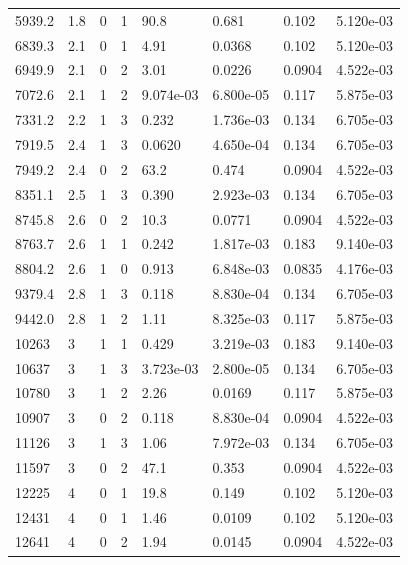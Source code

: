 \documentclass[preview]{standalone}
\begin{document}
{{\begin{tabular}{L{1.2cm}C{1.2cm} C{0.3cm}C{0.5cm} C{1.4cm}C{1.4cm} C{1.4cm}C{1.4cm}}
  5939.2  &   1.8  & 0     &  1 &  90.8  & 0.681  & 0.102 &  5.120e-03   \\ 
  6839.3  &   2.1  & 0     &  1 &  4.91  & 0.0368  & 0.102 &  5.120e-03   \\ 
  6949.9  &   2.1  & 0     &  2 &  3.01  & 0.0226  & 0.0904 &  4.522e-03   \\ 
  7072.6  &   2.1  & 1     &  2 &  9.074e-03  & 6.800e-05  & 0.117 &  5.875e-03   \\ 
  7331.2  &   2.2  & 1     &  3 &  0.232  & 1.736e-03  & 0.134 &  6.705e-03   \\ 
  7919.5  &   2.4  & 1     &  3 &  0.0620  & 4.650e-04  & 0.134 &  6.705e-03   \\ 
  7949.2  &   2.4  & 0     &  2 &  63.2  & 0.474  & 0.0904 &  4.522e-03   \\ 
  8351.1  &   2.5  & 1     &  3 &  0.390  & 2.923e-03  & 0.134 &  6.705e-03   \\ 
  8745.8  &   2.6  & 0     &  2 &  10.3  & 0.0771  & 0.0904 &  4.522e-03   \\ 
  8763.7  &   2.6  & 1     &  1 &  0.242  & 1.817e-03  & 0.183 &  9.140e-03   \\ 
  8804.2  &   2.6  & 1     &  0 &  0.913  & 6.848e-03  & 0.0835 &  4.176e-03   \\ 
  9379.4  &   2.8  & 1     &  3 &  0.118  & 8.830e-04  & 0.134 &  6.705e-03   \\ 
  9442.0  &   2.8  & 1     &  2 &  1.11  & 8.325e-03  & 0.117 &  5.875e-03   \\ 
  10263  &     3  & 1     &  1 &  0.429  & 3.219e-03  & 0.183 &  9.140e-03   \\ 
  10637  &     3  & 1     &  3 &  3.723e-03  & 2.800e-05  & 0.134 &  6.705e-03   \\ 
  10780  &     3  & 1     &  2 &  2.26  & 0.0169  & 0.117 &  5.875e-03   \\ 
  10907  &     3  & 0     &  2 &  0.118  & 8.830e-04  & 0.0904 &  4.522e-03   \\ 
  11126  &     3  & 1     &  3 &  1.06  & 7.972e-03  & 0.134 &  6.705e-03   \\ 
  11597  &     3  & 0     &  2 &  47.1  & 0.353  & 0.0904 &  4.522e-03   \\ 
  12225  &     4  & 0     &  1 &  19.8  & 0.149  & 0.102 &  5.120e-03   \\ 
  12431  &     4  & 0     &  1 &  1.46  & 0.0109  & 0.102 &  5.120e-03   \\ 
  12641  &     4  & 0     &  2 &  1.94  & 0.0145  & 0.0904 &  4.522e-03   \\ 

\end{tabular}}}
\end{document}
